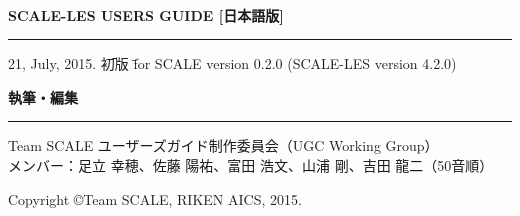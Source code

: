 \newpage
\thispagestyle{empty}

　\\

\vspace{10mm}
{\large{\bf SCALE-LES USERS GUIDE [日本語版]}}\\
\hrule width 90mm
\begin{tabbing} 
21, July, 2015.  \= \=  初版  \= \=  for SCALE version 0.2.0 (SCALE-LES version 4.2.0)
\end{tabbing} 


\vspace{10mm}
{\large{\bf 執筆・編集}}\\
\hrule width 90mm
\begin{tabbing} 
Team SCALE ユーザーズガイド制作委員会（UGC Working Group）\\
メンバー：足立 幸穂、佐藤 陽祐、富田 浩文、山浦 剛、吉田 龍二（50音順）
\end{tabbing} 


\vspace{110mm}
\begin{flushright}

\vspace{10mm}
Copyright \copyright Team SCALE, RIKEN AICS, 2015.
\end{flushright}

